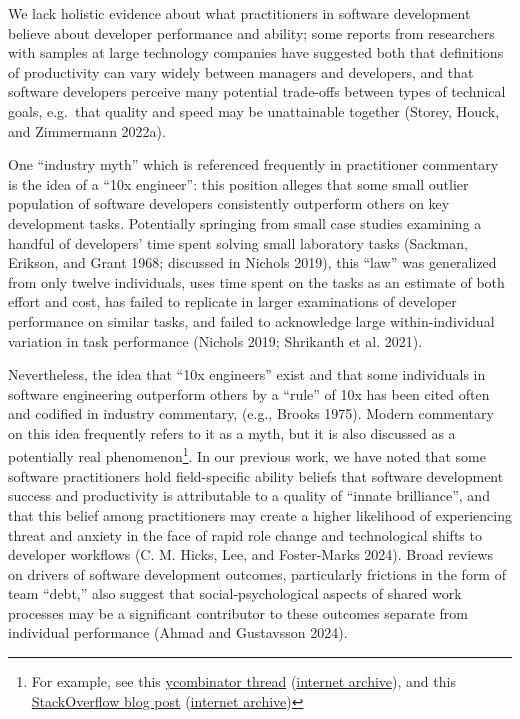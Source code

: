 \documentclass[
]{article}
\begin{document}
We lack holistic evidence about what practitioners in software
development believe about developer performance and ability; some
reports from researchers with samples at large technology companies have
suggested both that definitions of productivity can vary widely between
managers and developers, and that software developers perceive many
potential trade-offs between types of technical goals, e.g.~that quality
and speed may be unattainable together (Storey, Houck, and Zimmermann
2022a).

One ``industry myth'' which is referenced frequently in practitioner
commentary is the idea of a ``10x engineer'': this position alleges that
some small outlier population of software developers consistently
outperform others on key development tasks. Potentially springing from
small case studies examining a handful of developers' time spent solving
small laboratory tasks (Sackman, Erikson, and Grant 1968; discussed in
Nichols 2019), this ``law'' was generalized from only twelve
individuals, uses time spent on the tasks as an estimate of both effort
and cost, has failed to replicate in larger examinations of developer
performance on similar tasks, and failed to acknowledge large
within-individual variation in task performance (Nichols 2019; Shrikanth
et al. 2021).

Nevertheless, the idea that ``10x engineers'' exist and that some
individuals in software engineering outperform others by a ``rule'' of
10x has been cited often and codified in industry commentary, (e.g.,
Brooks 1975). Modern commentary on this idea frequently refers to it as
a myth, but it is also discussed as a potentially real
phenomenon\footnote{For example, see this
  \href{https://news.ycombinator.com/item?id=22349531}{ycombinator
  thread}
  (\href{http://web.archive.org/web/20240917164935/https://stackoverflow.blog/2024/06/19/the-real-10x-developer-makes-their-whole-team-better/}{internet
  archive}), and this
  \href{https://stackoverflow.blog/2024/06/19/the-real-10x-developer-makes-their-whole-team-better}{StackOverflow
  blog post}
  (\href{http://web.archive.org/web/20231209171051/https://news.ycombinator.com/item?id=22349531}{internet
  archive})}. In our previous work, we have noted that some software
practitioners hold field-specific ability beliefs that software
development success and productivity is attributable to a quality of
``innate brilliance'', and that this belief among practitioners may
create a higher likelihood of experiencing threat and anxiety in the
face of rapid role change and technological shifts to developer
workflows (C. M. Hicks, Lee, and Foster-Marks 2024). Broad reviews on
drivers of software development outcomes, particularly frictions in the
form of team ``debt,'' also suggest that social-psychological aspects of
shared work processes may be a significant contributor to these outcomes
separate from individual performance (Ahmad and Gustavsson 2024).
\end{document}
